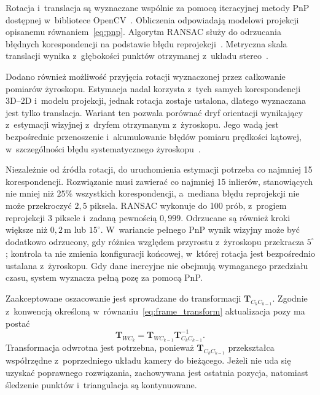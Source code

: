 Rotacja i~translacja są wyznaczane wspólnie za pomocą iteracyjnej metody PnP dostępnej w~bibliotece OpenCV~\cite{opencv_calib3d}. Obliczenia odpowiadają modelowi projekcji opisanemu równaniem~\eqref{eq:pnp}. Algorytm RANSAC służy do odrzucania błędnych korespondencji na podstawie błędu reprojekcji~\cite{fischler1981ransac}. Metryczna skala translacji wynika z~głębokości punktów otrzymanej z~układu stereo~\cite{hartley2004multiple}.

Dodano również możliwość przyjęcia rotacji wyznaczonej przez całkowanie pomiarów żyroskopu. Estymacja nadal korzysta z~tych samych korespondencji 3D--2D i~modelu projekcji, jednak rotacja zostaje ustalona, dlatego wyznaczana jest tylko translacja. Wariant ten pozwala porównać dryf orientacji wynikający z~estymacji wizyjnej z~dryfem otrzymanym z~żyroskopu. Jego wadą jest bezpośrednie przenoszenie i~akumulowanie błędów pomiaru prędkości kątowej, w~szczególności błędu systematycznego żyroskopu~\cite{forster2015preintegration}.

Niezależnie od źródła rotacji, do uruchomienia estymacji potrzeba co najmniej 15 korespondencji. Rozwiązanie musi zawierać co najmniej 15 inlierów, stanowiących nie mniej niż $25\%$ wszystkich korespondencji, a~mediana błędu reprojekcji nie może przekroczyć $2{,}5$ piksela. RANSAC wykonuje do 100 prób, z~progiem reprojekcji 3 piksele i~zadaną pewnością $0{,}999$. Odrzucane są również kroki większe niż $0{,}2\,\mathrm{m}$ lub $15^\circ$. W~wariancie pełnego PnP wynik wizyjny może być dodatkowo odrzucony, gdy różnica względem przyrostu z~żyroskopu przekracza $5^\circ$; kontrola ta nie zmienia konfiguracji końcowej, w~której rotacja jest bezpośrednio ustalana z~żyroskopu. Gdy dane inercyjne nie obejmują wymaganego przedziału czasu, system wyznacza pełną pozę za pomocą PnP.

Zaakceptowane oszacowanie jest sprowadzane do transformacji $\mathbf{T}_{C_k C_{k-1}}$. Zgodnie z~konwencją określoną w~równaniu~\eqref{eq:frame_transform} aktualizacja pozy ma postać
\begin{equation}
    \mathbf{T}_{W C_k}
    =
    \mathbf{T}_{W C_{k-1}}
    \mathbf{T}_{C_k C_{k-1}}^{-1}.
    \label{eq:implementation_pose_update}
\end{equation}
Transformacja odwrotna jest potrzebna, ponieważ $\mathbf{T}_{C_k C_{k-1}}$ przekształca współrzędne z~poprzedniego układu kamery do bieżącego. Jeżeli nie uda się uzyskać poprawnego rozwiązania, zachowywana jest ostatnia pozycja, natomiast śledzenie punktów i~triangulacja są kontynuowane.

